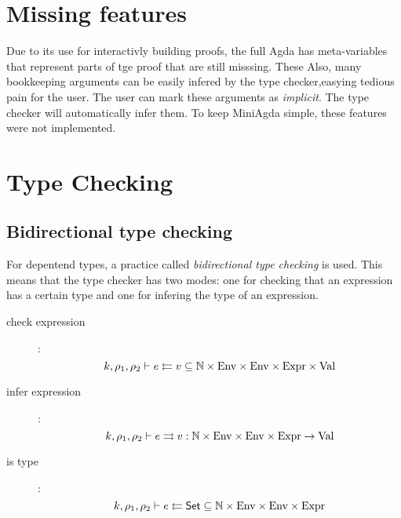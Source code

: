 \section{Missing features}
Due to its use for interactivly building proofs, the full Agda has meta-variables that represent parts of tge proof that are still misssing. These 
Also, many bookkeeping arguments can be easily infered by the type checker,easying tedious pain for the user.
The user can mark these arguments as \emph{implicit}. The type checker will automatically infer them.
To keep MiniAgda simple, these features were not implemented.

\section{Type Checking}

\renewcommand\Check[5]{#1,#2,#3\vdash#4\leftleftarrows#5}
\newcommand\IsType[4]{\Check{#1}{#2}{#3}{#4}{\Set}}
\newcommand\Infer[5]{#1,#2,#3\vdash#4\rightrightarrows#5}
\newcommand\EqVal[4]{#1,#2\vdash#3\Leftrightarrow#4}
\newcommand\FeqVal[4]{#1,#2\vdash#3{\;\leftrightarrow\;}#4}
\newcommand\DeqVal[2]{\vdash#1\leftrightarrow#2}
\newcommand\LeqVal[4]{#1,#2,\vdash#3\leq#4}
\newcommand\FleqVal[4]{#1,#2\vdash#3{\;\ll\;}#4}
\newcommand\DLeqVal[2]{\vdash#1\leq#2}
\newcommand\SzLeq[2]{\vdash#1\sqsubseteq#2}

\subsection{Bidirectional type checking} 
For depentend types, a practice called \emph{bidirectional type checking} is used.
This means that the type checker has two modes:
one for checking that an expression has a certain type and one for infering the type of an expression.

\begin{description}
\item[check expression]:
\[\Check{k}{\rho_1}{\rho_2}{e}{v} \subseteq \cN \times \Env \times \Env \times \Expr \times \Val\]
\item[infer expression]:
\[\Infer{k}{\rho_1}{\rho_2}{e}{v} : \cN \times \Env \times \Env \times \Expr \ra \Val\]
\item[is type]:
\[\IsType{k}{\rho_1}{\rho_2}{e} \subseteq \cN \times \Env \times \Env \times \Expr\]
\end{description}

